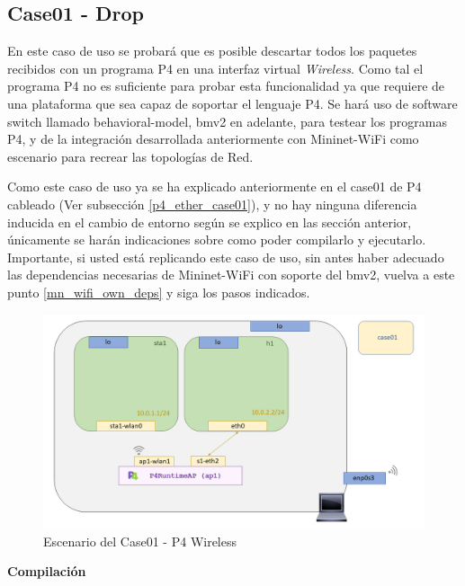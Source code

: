 \subsection{Case01 - Drop}
\label{p4_wifi_case01}

En este caso de uso se probará que es posible descartar todos los paquetes recibidos con un programa P4 en una interfaz virtual \textit{Wireless}. Como tal el programa P4 no es suficiente para probar esta funcionalidad ya que requiere de una plataforma que sea capaz de soportar el lenguaje P4. Se hará uso de software switch llamado behavioral-model, \gls{bmv2} en adelante, para testear los programas P4, y de la integración desarrollada anteriormente con Mininet-WiFi como escenario para recrear las topologías de Red.\\
\par

Como este caso de uso ya se ha explicado anteriormente en el case01 de P4 cableado (Ver subsección \ref{p4_ether_case01}), y no hay ninguna diferencia inducida en el cambio de entorno según se explico en las sección anterior,  únicamente se harán indicaciones sobre como poder compilarlo y ejecutarlo. Importante, si usted está replicando este caso de uso, sin antes haber adecuado las dependencias necesarias de Mininet-WiFi con soporte del \gls{bmv2}, vuelva a este punto \ref{mn_wifi_own_deps} y siga los pasos indicados.

\begin{figure}[ht]
    \centering
    \includegraphics[width=16cm]{archivos/img/dev/p4-wifi/case01/scenario.png}
    \caption{Escenario del Case01 - P4 Wireless}
    \label{fig:case01_p4_wifi_scenario}
\end{figure}

\vspace{0.2cm}
\textbf{Compilación}\\
\par


